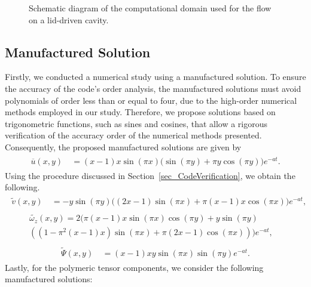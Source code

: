 \documentclass[preprint, 12pt]{elsarticle}
\begin{document}
\begin{figure}[H]
{
    }
    \caption{Schematic diagram of the computational domain used for the flow on a lid-driven cavity.\label{fig_domain}}
\end{figure}

\subsection{Manufactured Solution}

Firstly, we conducted a numerical study using a manufactured solution. To ensure the accuracy of the code's order analysis, the manufactured solutions must avoid polynomials of order less than or equal to four, due to the high-order numerical methods employed in our study. Therefore, we propose solutions based on trigonometric functions, such as sines and cosines, that allow a rigorous verification of the accuracy order of the numerical methods presented. Consequently, the proposed manufactured solutions are given by
\begin{gather}
    \begin{aligned}
        \overline{u}(x,y) &~= (x-1) x \sin(\pi x) \bigg(\sin(\pi y)+\pi y \cos(\pi y)\bigg) e^{-a t}.\label{eq:u_case0_2}
    \end{aligned}
\end{gather}
Using the procedure discussed in Section~\ref{sec_CodeVerification}, we obtain the following.
\begin{gather}
    \begin{aligned}
        \widetilde{v}(x,y) &~= -y\sin(\pi y)\bigg((2x-1)\sin(\pi x)+\pi(x-1)x\cos(\pi x)\bigg)e^{-a t},\label{eq:v_case0_2}
    \end{aligned}
\end{gather}
\begin{gather}
    \begin{aligned}
        \widetilde{\omega_{z}}(x,y) = 2\bigg(\pi(x-1)x\sin(\pi x)\cos(\pi y)+y\sin(\pi y) &~ \\ \left(\left(1-\pi^2(x-1)x\right)\sin(\pi x)+\pi(2x - 1)\cos(\pi x)\right)\bigg)e^{-a t},\label{eq:wz_case0_2}
    \end{aligned}
\end{gather}
\begin{gather}
    \begin{aligned}
        \widetilde{\Psi}(x,y) &~= (x-1) x y\sin(\pi x)\sin(\pi y) e^{-a t}.\label{eq:psi_case0_2}
    \end{aligned}
\end{gather}
Lastly, for the polymeric tensor components, we consider the following manufactured solutions:
\end{document}
